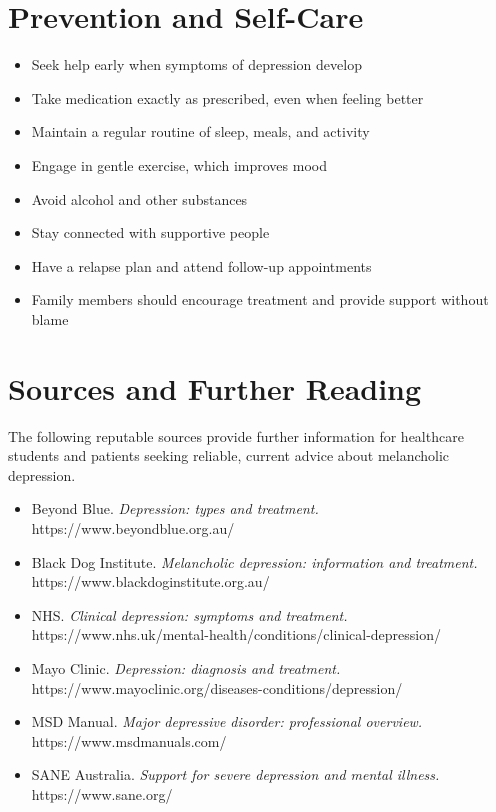 \section*{Prevention and Self-Care}
\begin{itemize}
    \item Seek help early when symptoms of depression develop
    \item Take medication exactly as prescribed, even when feeling better
    \item Maintain a regular routine of sleep, meals, and activity
    \item Engage in gentle exercise, which improves mood
    \item Avoid alcohol and other substances
    \item Stay connected with supportive people
    \item Have a relapse plan and attend follow-up appointments
    \item Family members should encourage treatment and provide support without blame
\end{itemize}

\section*{Sources and Further Reading}
The following reputable sources provide further information for healthcare students and patients seeking reliable, current advice about melancholic depression.

\begin{itemize}
    \item Beyond Blue. \textit{Depression: types and treatment.} https://www.beyondblue.org.au/
    \item Black Dog Institute. \textit{Melancholic depression: information and treatment.} https://www.blackdoginstitute.org.au/
    \item NHS. \textit{Clinical depression: symptoms and treatment.} https://www.nhs.uk/mental-health/conditions/clinical-depression/
    \item Mayo Clinic. \textit{Depression: diagnosis and treatment.} https://www.mayoclinic.org/diseases-conditions/depression/
    \item MSD Manual. \textit{Major depressive disorder: professional overview.} https://www.msdmanuals.com/
    \item SANE Australia. \textit{Support for severe depression and mental illness.} https://www.sane.org/
\end{itemize}
